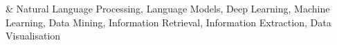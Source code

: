 %
\color{gray}{Research interests}
& Natural Language Processing, Language Models, Deep Learning, Machine Learning, Data Mining, Information Retrieval, Information Extraction, Data Visualisation \\